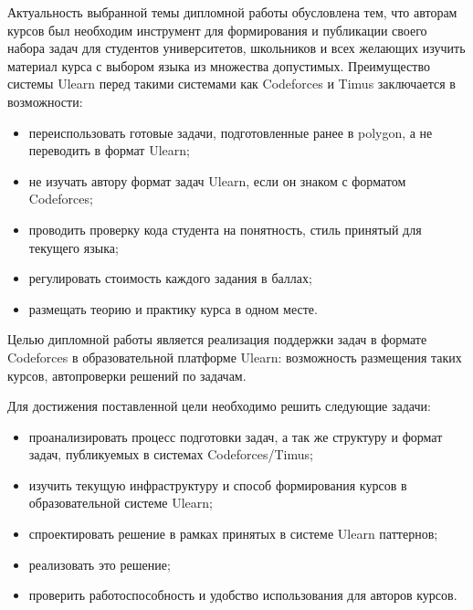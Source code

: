 \Introduction
Актуальность выбранной темы дипломной работы обусловлена тем, что авторам курсов был необходим инструмент для формирования и публикации своего набора задач для студентов университетов, школьников и всех желающих изучить материал курса с выбором языка из множества допустимых. Преимущество системы Ulearn перед такими системами как Codeforces и Timus заключается в возможности:
\begin{itemize}
\item переиспользовать готовые задачи, подготовленные ранее в polygon, а не переводить в формат Ulearn;
\item не изучать автору формат задач Ulearn, если он знаком с форматом Codeforces;
\item проводить проверку кода студента на понятность, стиль принятый для текущего языка;
\item регулировать стоимость каждого задания в баллах;
\item размещать теорию и практику курса в одном месте.
\end{itemize}

Целью дипломной работы является реализация поддержки задач в формате Codeforces в образовательной платформе Ulearn: возможность размещения таких курсов, автопроверки решений по задачам.

Для достижения поставленной цели необходимо решить следующие задачи:

\begin{itemize}
\item проанализировать процесс подготовки задач, а так же структуру и формат задач, публикуемых в системах Codeforces/Timus;
\item изучить текущую инфраструктуру и способ формирования курсов в образовательной системе Ulearn;
\item спроектировать решение в рамках принятых в системе Ulearn паттернов;
\item реализовать это решение;
\item проверить работоспособность и удобство использования для авторов курсов.
\end{itemize}

